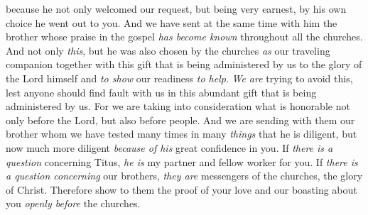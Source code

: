 \begin{biblechapter}
\verse because he not only welcomed our request, but being very earnest, by his own choice he went out to you.
\verse And we have sent at the same time with him the brother whose praise in the gospel \textit{has become known} throughout all the churches.
\verse And not only \textit{this}, but he was also chosen by the churches \textit{as} our traveling companion together with this gift that is being administered by us to the glory of the Lord himself and \textit{to show} our readiness \textit{to help}.
\verse \textit{We are} trying to avoid this, lest anyone should find fault with us in this abundant gift that is being administered by us.
\verse For we are taking into consideration what is honorable not only before the Lord, but also before people.
\verse And we are sending with them our brother whom we have tested many times in many \textit{things} that he is diligent, but now much more diligent \textit{because of his} great confidence in you.
\verse If \textit{there is a question} concerning Titus, \textit{he is} my partner and fellow worker for you. If \textit{there is a question concerning} our brothers, \textit{they are} messengers of the churches, the glory of Christ.
\verse Therefore show to them the proof of your love and our boasting about you \textit{openly before} the churches.
\end{biblechapter}

